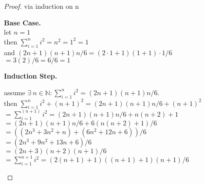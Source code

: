 \documentclass[12pt]{jhwhw}
\begin{document}
\solution
\begin{proof} via induction on n

\bigbreak
\textbf{Base Case.} \\
	let $n=1$ \\
	then $\sum_{i=1}^{n}i^{2} = n^2 = 1^2 = 1$ \\
	and $(2n+1)(n+1)n/6 = (2\cdot 1+1)(1+1)\cdot 1/6$ \\
	$= 3(2)/6 = 6/6 = 1$

\bigbreak
\textbf{Induction Step.} \\
\begin{spacing}{1.6}
	assume $\exists\ n\in \mathbb{N} : \sum_{i=1}^{n} i^{2} = (2n+1)(n+1)n/6$. \\
	then $\sum_{i=1}^{n}i^{2} + (n+1)^2 = (2n+1)(n+1)n/6 + (n+1)^2$ \\
	$ = \sum_{i=1}^{(n+1)}i^{2} = (2n+1)(n+1)n/6 + n(n+2)+1$ \\
	$ = (2n+1)(n+1)n/6 + 6(n(n+2)+1)/6$ \\
	$ = ((2n^3 + 3n^2 + n) + (6n^2 + 12n + 6))/6$ \\
	$ = (2n^3 + 9n^2 + 13n + 6)/6$ \\
	$ = (2n+3)(n+2)(n+1)/6$ \\
	$ = \sum_{i=1}^{n+1}i^{2} = (2(n+1)+1)((n+1)+1)(n+1)/6$ \\

\end{spacing}
\end{proof}
\end{document}
